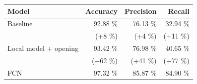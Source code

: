 \documentclass{beamer}
\begin{document}
\begin{frame}[plain]{}
    \begin{table}
    \begin{tabular}{lrrr}
    \toprule
    \textbf{Model}        & \textbf{Accuracy} & \textbf{Precision} & \textbf{Recall}   \\ \midrule
    Baseline              & 92.88 \%          & 76.13 \%         & 32.94 \% \\
                          & {\tiny (+8 \%)}   & {\tiny (+4 \%)}  & {\tiny (+11 \%)}\\
    Local model + opening & 93.42 \%          & 76.98 \%         & 40.65 \% \\
                          & {\tiny (+62 \%)}  & {\tiny (+41 \%)} & {\tiny (+77 \%)}\\
    FCN                   & 97.32 \%          & 85.87 \%         & 84.90 \% \\ \bottomrule
    \end{tabular}
    \end{table}
\end{frame}
\end{document}
